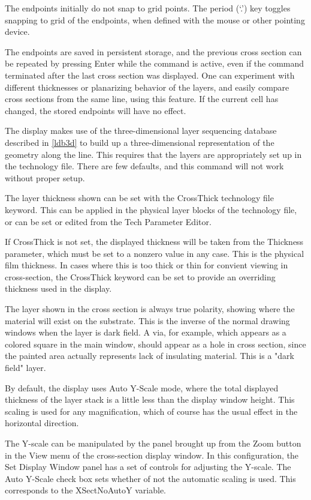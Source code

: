 The endpoints initially do not snap to grid points.  The period (`.')
key toggles snapping to grid of the endpoints, when defined with the
mouse or other pointing device.

The endpoints are saved in persistent storage, and the previous cross
section can be repeated by pressing {\kb Enter} while the command is
active, even if the command terminated after the last cross section
was displayed.  One can experiment with different thicknesses or
planarizing behavior of the layers, and easily compare cross sections
from the same line, using this feature.  If the current cell has
changed, the stored endpoints will have no effect.

The display makes use of the three-dimensional layer sequencing
database described in \ref{ldb3d} to build up a three-dimensional
representation of the geometry along the line.  This requires that the
layers are appropriately set up in the technology file.  There are few
defaults, and this command will not work without proper setup.

The layer thickness shown can be set with the {\et CrossThick}
technology file keyword.  This can be applied in the physical layer
blocks of the technology file, or can be set or edited from the {\cb
Tech Parameter Editor}.

If {\et CrossThick} is not set, the displayed thickness will be taken
from the {\et Thickness} parameter, which must be set to a nonzero
value in any case.  This is the physical film thickness.  In cases
where this is too thick or thin for convient viewing in cross-section,
the {\et CrossThick} keyword can be set to provide an overriding
thickness used in the display.

The layer shown in the cross section is always true polarity, showing
where the material will exist on the substrate.  This is the inverse
of the normal drawing windows when the layer is dark field.  A via,
for example, which appears as a colored square in the main window,
should appear as a hole in cross section, since the painted area
actually represents lack of insulating material.  This is a "dark
field" layer.

By default, the display uses {\cb Auto Y-Scale} mode, where the total
displayed thickness of the layer stack is a little less than the
display window height.  This scaling is used for any magnification,
which of course has the usual effect in the horizontal direction.

The Y-scale can be manipulated by the panel brought up from the {\cb
Zoom} button in the {\cb View} menu of the cross-section display
window.  In this configuration, the {\cb Set Display Window} panel has
a set of controls for adjusting the Y-scale.  The {\cb Auto Y-Scale}
check box sets whether of not the automatic scaling is used.  This
corresponds to the {\et XSectNoAutoY} variable.

